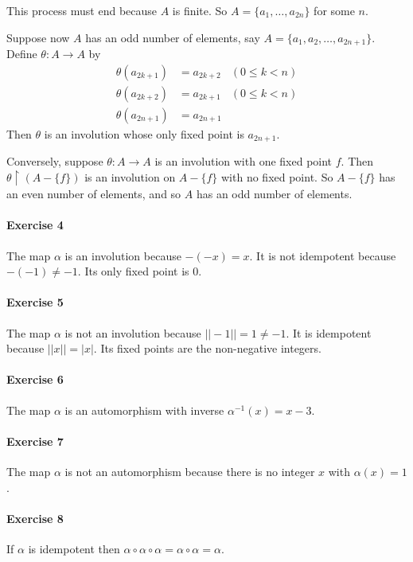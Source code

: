 \documentclass{report}
\newcommand{\inv}[1]{\ensuremath{{#1}^{-1}}}
\begin{document}
    This process must end because $A$ is finite. So $A = \{a_1, \ldots, a_{2n} \}$ for some $n$.

    Suppose now $A$ has an odd number of elements, say $A = \{ a_1, a_2, \ldots, a_{2n+1} \}$. Define $\theta :
    A \rightarrow A$ by
    \begin{align*}
        \theta(a_{2k+1}) & = a_{2k+2} & (0 \leq k < n) \\
        \theta(a_{2k+2}) & = a_{2k+1} & (0 \leq k < n) \\
        \theta(a_{2n+1}) & = a_{2n+1}
    \end{align*}
    Then $\theta$ is an involution whose only fixed point is $a_{2n+1}$.

    Conversely, suppose $\theta : A \rightarrow A$ is an involution with one fixed point $f$. Then
    $\theta \restriction (A - \{f\})$ is an involution on $A - \{ f \}$ with no fixed point. So $A - \{f\}$
    has an even number of elements, and so $A$ has an odd number of elements.

    \paragraph{Exercise 4}
    The map $\alpha$ is an involution because $-(-x) = x$. It is not idempotent because $-(-1) \neq -1$. Its
    only fixed point is 0.

    \paragraph{Exercise 5}
    The map $\alpha$ is not an involution because $||-1|| = 1 \neq -1$. It is idempotent because $||x|| = |x|$.
    Its fixed points are the non-negative integers.

    \paragraph{Exercise 6}
    The map $\alpha$ is an automorphism with inverse $\inv{\alpha}(x) = x - 3$.

    \paragraph{Exercise 7}
    The map $\alpha$ is not an automorphism because there is no integer $x$ with $\alpha(x) = 1$.

    \paragraph{Exercise 8}
    If $\alpha$ is idempotent then $\alpha \circ \alpha \circ \alpha = \alpha \circ \alpha = \alpha$.
\end{document}
